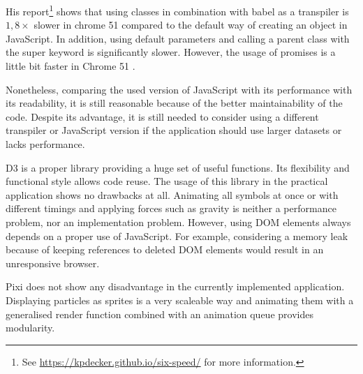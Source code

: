 His report\footnote{See \href{https://kpdecker.github.io/six-speed/}{https://kpdecker.github.io/six-speed/} for more information.} shows that using classes in combination with babel as a transpiler is $1,8\times$ slower in chrome 51 compared to the default way of creating an object in JavaScript. In addition, using default parameters and calling a parent class with the super keyword is significantly slower. However, the usage of promises is a little bit faster in Chrome 51 .

Nonetheless, comparing the used version of JavaScript with its performance with its readability, it is still reasonable because of the better maintainability of the code. Despite its advantage, it is still needed to consider using a different transpiler or JavaScript version if the application should use larger datasets or lacks performance.

\ac{D3} is a proper library providing a huge set of useful functions. Its flexibility and functional style allows code reuse. The usage of this library in the practical application shows no drawbacks at all. Animating all symbols at once or with different timings and applying forces such as gravity is neither a performance problem, nor an implementation problem. However, using \ac{DOM} elements always depends on a proper use of JavaScript. For example, considering a memory leak because of keeping references to deleted \ac{DOM} elements would result in an unresponsive browser.

\ac{Pixi} does not show any disadvantage in the currently implemented application. Displaying particles as sprites is a very scaleable way and animating them with a generalised render function combined with an animation queue provides modularity.